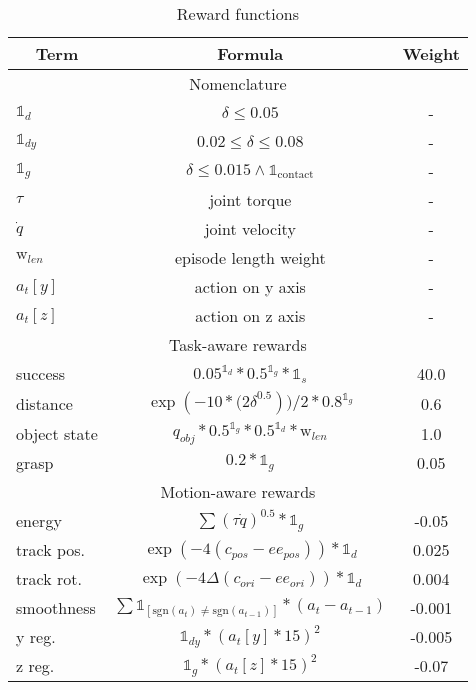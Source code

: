 \begin{table}[]
\centering
\begin{tabular}{lll}
\hline
\multicolumn{1}{c}{\textbf{Term}} & \multicolumn{1}{c}{\textbf{Formula}} & \multicolumn{1}{c}{\textbf{Weight}} \\ \hline
\multicolumn{3}{c}{Nomenclature}  \\ \hline
$\mathds{1}_{d}$ & \multicolumn{1}{c}{$\delta \leq 0.05$} & \multicolumn{1}{c}{-} \\
$\mathds{1}_{dy}$ & \multicolumn{1}{c}{$0.02 \leq \delta \leq 0.08$} & \multicolumn{1}{c}{-} \\
$\mathds{1}_{g}$ & \multicolumn{1}{c}{$\delta \leq 0.015 \wedge \mathds{1}_{\text{contact}}$} & \multicolumn{1}{c}{-} \\
$\tau$ & \multicolumn{1}{c}{joint torque} & \multicolumn{1}{c}{-} \\
$\dot{q}$ & \multicolumn{1}{c}{joint velocity} & \multicolumn{1}{c}{-} \\
$\text{w}_{len}$ & \multicolumn{1}{c}{episode length weight} & \multicolumn{1}{c}{-} \\
$a_t[y]$ & \multicolumn{1}{c}{action on y axis} & \multicolumn{1}{c}{-} \\
$a_t[z]$ & \multicolumn{1}{c}{action on z axis} & \multicolumn{1}{c}{-} \\
\hline
\multicolumn{3}{c}{Task-aware rewards} \\ \hline
success & \multicolumn{1}{c}{$0.05^{\mathds{1}_{d}} * 0.5^{\mathds{1}_{g}} * \mathds{1}_{s}$} & \multicolumn{1}{c}{40.0} \\
distance & \multicolumn{1}{c}{$\exp({-10*(2\delta^{0.5}}))/2 * 0.8^{\mathds{1}_{g}}$} & \multicolumn{1}{c}{0.6} \\
object state & \multicolumn{1}{c}{$q_{obj} * 0.5^{\mathds{1}_{g}} * 0.5^{\mathds{1}_{d}} * \text{w}_{len}$} & \multicolumn{1}{c}{1.0} \\
grasp & \multicolumn{1}{c}{$0.2 * \mathds{1}_{g}$} & \multicolumn{1}{c}{0.05} \\
\hline
\multicolumn{3}{c}{Motion-aware rewards}  \\
\hline
energy & \multicolumn{1}{c}{$\sum{(\tau \dot{q})^{0.5}} * \mathds{1}_{g}$} & \multicolumn{1}{c}{-0.05} \\
track pos. & \multicolumn{1}{c}{$\exp(-4(c_{pos} - ee_{pos})) * \mathds{1}_{d}$} & \multicolumn{1}{c}{0.025} \\
track rot. & \multicolumn{1}{c}{$\exp(-4\Delta(c_{ori} - ee_{ori})) * \mathds{1}_{d}$} & \multicolumn{1}{c}{0.004} \\
smoothness & \multicolumn{1}{c}{$\sum  \mathds{1}_{[\text{sgn}(a_t) \neq \text{sgn}(a_{t-1})]} * (a_t - a_{t-1})$} & \multicolumn{1}{c}{-0.001} \\
y reg. & \multicolumn{1}{c}{$\mathds{1}_{dy} * (a_t[y]*15)^2$} & \multicolumn{1}{c}{-0.005} \\
z reg. & \multicolumn{1}{c}{$\mathds{1}_{g} * (a_t[z]*15)^2$} & \multicolumn{1}{c}{-0.07} \\
\end{tabular}
\caption{Reward functions}
\label{table:reward}
\end{table}